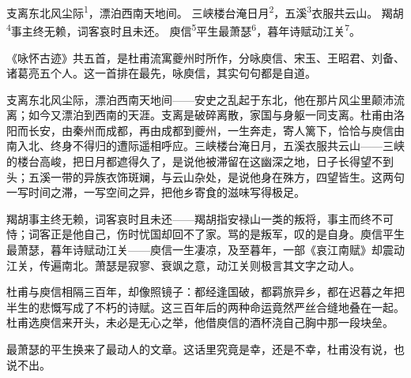 
\begin{poem}
支离东北风尘际\textsuperscript{1}，漂泊西南天地间。
三峡楼台淹日月\textsuperscript{2}，五溪\textsuperscript{3}衣服共云山。
羯胡\textsuperscript{4}事主终无赖，词客哀时且未还。
庾信\textsuperscript{5}平生最萧瑟\textsuperscript{6}，暮年诗赋动江关\textsuperscript{7}。
\end{poem}

\begin{annotations}
\end{annotations}

\begin{appreciation}
《咏怀古迹》共五首，是杜甫流寓夔州时所作，分咏庾信、宋玉、王昭君、刘备、诸葛亮五个人。这一首排在最先，咏庾信，其实句句都是自道。

支离东北风尘际，漂泊西南天地间——安史之乱起于东北，他在那片风尘里颠沛流离；如今又漂泊到西南的天涯。支离是破碎离散，家国与身躯一同支离。杜甫由洛阳而长安，由秦州而成都，再由成都到夔州，一生奔走，寄人篱下，恰恰与庾信由南入北、终身不得归的遭际遥相呼应。三峡楼台淹日月，五溪衣服共云山——三峡的楼台高峻，把日月都遮得久了，是说他被滞留在这幽深之地，日子长得望不到头；五溪一带的异族衣饰斑斓，与云山杂处，是说他身在殊方，四望皆生。这两句一写时间之滞，一写空间之异，把他乡寄食的滋味写得极足。

羯胡事主终无赖，词客哀时且未还——羯胡指安禄山一类的叛将，事主而终不可恃；词客正是他自己，伤时忧国却回不了家。骂的是叛军，叹的是自身。庾信平生最萧瑟，暮年诗赋动江关——庾信一生凄凉，及至暮年，一部《哀江南赋》却震动江关，传遍南北。萧瑟是寂寥、衰飒之意，动江关则极言其文字之动人。

杜甫与庾信相隔三百年，却像照镜子：都经逢国破，都羁旅异乡，都在迟暮之年把半生的悲慨写成了不朽的诗赋。这三百年后的两种命运竟然严丝合缝地叠在一起。杜甫选庾信来开头，未必是无心之举，他借庾信的酒杯浇自己胸中那一段块垒。

最萧瑟的平生换来了最动人的文章。这话里究竟是幸，还是不幸，杜甫没有说，也说不出。
\end{appreciation}
